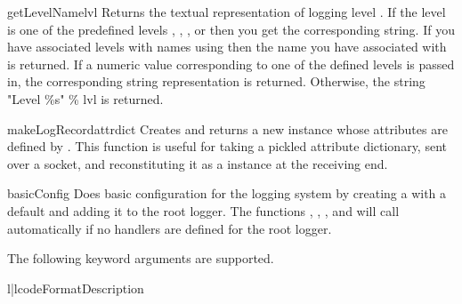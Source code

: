 \begin{funcdesc}{getLevelName}{lvl}
Returns the textual representation of logging level . If the
level is one of the predefined levels ,
, ,  or 
then you get the corresponding string. If you have associated levels
with names using  then the name you have associated
with  is returned. If a numeric value corresponding to one of the
defined levels is passed in, the corresponding string representation is
returned. Otherwise, the string "Level \%s" \% lvl is returned.
\end{funcdesc}

\begin{funcdesc}{makeLogRecord}{attrdict}
Creates and returns a new  instance whose attributes are
defined by . This function is useful for taking a pickled
 attribute dictionary, sent over a socket, and reconstituting
it as a  instance at the receiving end.
\end{funcdesc}

\begin{funcdesc}{basicConfig}{}
Does basic configuration for the logging system by creating a
 with a default  and adding it to
the root logger. The functions , ,
,  and  will call
 automatically if no handlers are defined for the
root logger.


The following keyword arguments are supported.

\begin{tableii}{l|l}{code}{Format}{Description}
\end{tableii}

\end{funcdesc}

